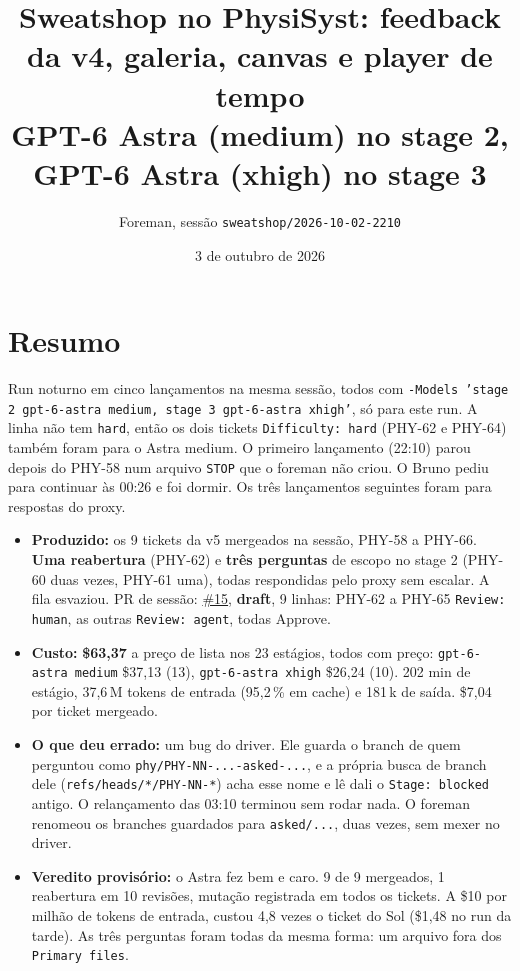 \documentclass[11pt,a4paper]{article}
\title{Sweatshop no PhysiSyst: feedback da v4, galeria, canvas e player de tempo\\\large GPT-6 Astra (medium) no stage 2, GPT-6 Astra (xhigh) no stage 3}
\author{Foreman, sessão \texttt{sweatshop/2026-10-02-2210}}
\date{3 de outubro de 2026}
\begin{document}
\maketitle

\section*{Resumo}

Run noturno em cinco lançamentos na mesma sessão, todos com
\texttt{-Models 'stage 2 gpt-6-astra medium, stage 3 gpt-6-astra xhigh'}, só
para este run. A linha não tem \texttt{hard}, então os dois tickets
\texttt{Difficulty: hard} (PHY-62 e PHY-64) também foram para o Astra medium. O
primeiro lançamento (22:10) parou depois do PHY-58 num arquivo \texttt{STOP} que
o foreman não criou. O Bruno pediu para continuar às 00:26 e foi dormir. Os três
lançamentos seguintes foram para respostas do proxy.

\begin{itemize}
  \item \textbf{Produzido:} os 9 tickets da v5 mergeados na sessão, PHY-58 a
        PHY-66. \textbf{Uma reabertura} (PHY-62) e \textbf{três perguntas} de
        escopo no stage 2 (PHY-60 duas vezes, PHY-61 uma), todas respondidas
        pelo proxy sem escalar. A fila esvaziou. PR de sessão:
        \href{https://github.com/Laginho/PhysiSyst/pull/15}{\#15},
        \textbf{draft}, 9 linhas: PHY-62 a PHY-65 \texttt{Review: human}, as
        outras \texttt{Review: agent}, todas Approve.
  \item \textbf{Custo:} \textbf{\$63,37} a preço de lista nos 23 estágios,
        todos com preço: \texttt{gpt-6-astra medium} \$37,13 (13),
        \texttt{gpt-6-astra xhigh} \$26,24 (10). 202 min de estágio, 37,6\,M
        tokens de entrada (95,2\,\% em cache) e 181\,k de saída. \$7,04 por
        ticket mergeado.
  \item \textbf{O que deu errado:} um bug do driver. Ele guarda o branch de
        quem perguntou como \texttt{phy/PHY-NN-...-asked-...}, e a própria
        busca de branch dele (\texttt{refs/heads/*/PHY-NN-*}) acha esse nome e
        lê dali o \texttt{Stage: blocked} antigo. O relançamento das 03:10
        terminou sem rodar nada. O foreman renomeou os branches guardados para
        \texttt{asked/...}, duas vezes, sem mexer no driver.
  \item \textbf{Veredito provisório:} o Astra fez bem e caro. 9 de 9
        mergeados, 1 reabertura em 10 revisões, mutação registrada em todos os
        tickets. A \$10 por milhão de tokens de entrada, custou 4,8 vezes o
        ticket do Sol (\$1,48 no run da tarde). As três perguntas foram todas
        da mesma forma: um arquivo fora dos \texttt{Primary files}.
\end{itemize}
\end{document}
